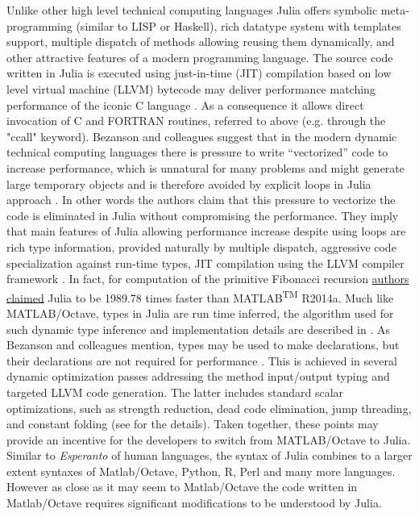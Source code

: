 Unlike other high level technical computing languages Julia offers symbolic meta-programming (similar to LISP or Haskell), rich datatype system with templates support, multiple dispatch of methods allowing reusing them dynamically, and other attractive features of a modern programming language. The source code written in Julia is executed using just-in-time (JIT) compilation based on low level virtual machine (LLVM) \cite{Lattner_2004} bytecode may deliver performance matching performance of the iconic C language \cite{bezanson2012julia, bezanson2014julia}. As a consequence it allows direct invocation of C and FORTRAN routines, referred to above (e.g. through the "ccall" keyword). Bezanson and colleagues suggest that in the modern dynamic technical computing languages there is pressure to write “vectorized” code to increase performance, which is unnatural for many problems and might generate large temporary objects and is therefore avoided by explicit loops in Julia approach \cite{bezanson2012julia}. In other words the authors claim that this pressure to vectorize the code is eliminated in Julia without compromising the performance. They imply that main features of Julia allowing performance increase despite using loops are rich type information, provided naturally by multiple dispatch, aggressive code specialization against run-time types, JIT compilation using the LLVM compiler framework \cite{bezanson2012julia, Lattner_2004}. In fact, for computation of the primitive Fibonacci recursion \href{http://julialang.org/benchmarks/}{authors claimed} Julia to be 1989.78 times faster than MATLAB\textsuperscript{TM} R2014a. Much like MATLAB/Octave, types in Julia are run time inferred, the algorithm used for such dynamic type inference and implementation details are described in \cite{Kaplan_1980, bezanson2012julia}. As Bezanson and colleagues mention, types may be used to make declarations, but their declarations are not required for performance \cite{bezanson2012julia}. This is achieved in several dynamic optimization passes addressing the method input/output typing and targeted LLVM code generation. The latter includes standard scalar optimizations, such as strength reduction, dead code elimination, jump threading, and constant folding (see \cite{bezanson2012julia} for the details). Taken together, these points may provide an incentive for the developers to switch from MATLAB/Octave to Julia. Similar to \textit{Esperanto} of human languages, the syntax of Julia combines to a larger extent syntaxes of Matlab/Octave, Python, R, Perl and many more languages. However as close as it may seem to Matlab/Octave the code written in Matlab/Octave requires significant modifications to be understood by Julia.

